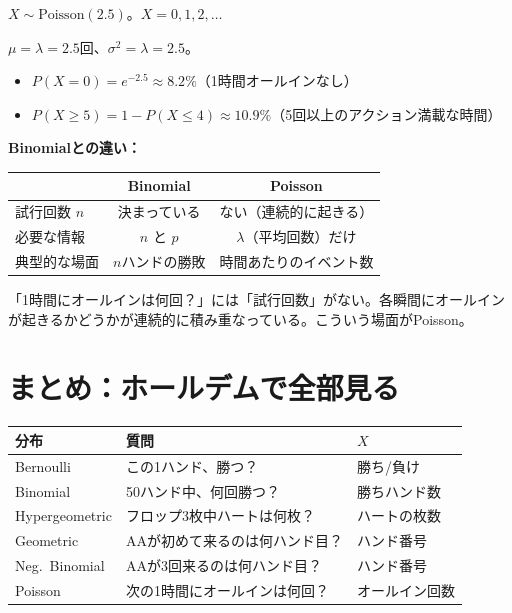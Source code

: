 \documentclass{article}
\theoremstyle{remark}
\begin{document}
$X \sim \text{Poisson}(2.5)$。$X = 0, 1, 2, \ldots$

$\mu = \lambda = 2.5$回、$\sigma^2 = \lambda = 2.5$。

\begin{itemize}
  \item $P(X = 0) = e^{-2.5} \approx 8.2\%$（1時間オールインなし）
  \item $P(X \ge 5) = 1 - P(X \le 4) \approx 10.9\%$（5回以上のアクション満載な時間）
\end{itemize}

\textbf{Binomialとの違い：}
\begin{center}
  \begin{tabular}{lcc}
    \toprule
    & Binomial & Poisson \\ \midrule
    試行回数 $n$ & 決まっている & ない（連続的に起きる） \\
    必要な情報 & $n$ と $p$ & $\lambda$（平均回数）だけ \\
    典型的な場面 & $n$ハンドの勝敗 & 時間あたりのイベント数 \\
    \bottomrule
  \end{tabular}
\end{center}

「1時間にオールインは何回？」には「試行回数」がない。各瞬間にオールインが起きるかどうかが連続的に積み重なっている。こういう場面がPoisson。

\section{まとめ：ホールデムで全部見る}

\begin{center}
\renewcommand{\arraystretch}{1.4}
\begin{tabular}{lll}
  \toprule
  \textbf{分布} & \textbf{質問} & \textbf{$X$} \\ \midrule
  Bernoulli & この1ハンド、勝つ？ & 勝ち/負け \\
  Binomial & 50ハンド中、何回勝つ？ & 勝ちハンド数 \\
  Hypergeometric & フロップ3枚中ハートは何枚？ & ハートの枚数 \\
  Geometric & AAが初めて来るのは何ハンド目？ & ハンド番号 \\
  Neg.\ Binomial & AAが3回来るのは何ハンド目？ & ハンド番号 \\
  Poisson & 次の1時間にオールインは何回？ & オールイン回数 \\
  \bottomrule
\end{tabular}
\end{center}
\end{document}
